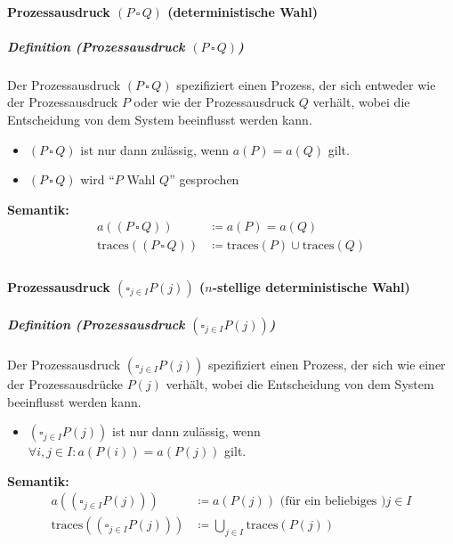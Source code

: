 \documentclass[a4paper, 11pt, accentcolor = tud3b]{tudreport}
\newcommand{\subsubparagraph}[1]{\hspace{1cm} \textbf{#1:}}
\newcommand{\definition}[2]{\subparagraph{Definition (#1)} #2}
\begin{document}
				    \paragraph{Prozessausdruck $ (P \,\square\, Q) $ (deterministische Wahl)}
					    \definition{Prozessausdruck $ (P \,\square\, Q) $}{
					    	Der Prozessausdruck $ (P \,\square\, Q) $ spezifiziert einen Prozess, der sich entweder wie der Prozessausdruck $ P $ oder wie der Prozessausdruck $ Q $ verhält, wobei die Entscheidung von dem System beeinflusst werden kann.
					    	\begin{itemize}
					    		\item $ (P \,\square\, Q) $ ist nur dann zulässig, wenn $ a(P) = a(Q) $ gilt.
					    		\item $ (P \,\square\, Q) $ wird \enquote{$ P $ Wahl $ Q $} gesprochen
					    	\end{itemize}
					    	
					    	\subsubparagraph{Semantik}
						    	\begin{align*}
							    	a((P \,\square\, Q)) &\coloneqq a(P) = a(Q) \\
							    	\text{traces}((P \,\square\, Q)) &\coloneqq \text{traces}(P) \cup \text{traces}(Q) \\
						    	\end{align*}
					    }
				    
				    \paragraph{Prozessausdruck $ (\square _ { j \in I } P(j)) $ ($ n $-stellige deterministische Wahl)}
					    \definition{Prozessausdruck $ (\square _ { j \in I } P(j)) $}{
					    	Der Prozessausdruck $ (\square _ { j \in I } P(j)) $ spezifiziert einen Prozess, der sich wie einer der Prozessausdrücke $ P(j) $ verhält, wobei die Entscheidung von dem System beeinflusst werden kann.
					    	\begin{itemize}
					    		\item $ (\square _ { j \in I } P(j)) $ ist nur dann zulässig, wenn $ \forall i, j \in I : a(P(i)) = a(P(j)) $ gilt.
					    	\end{itemize}
					    	
					    	\subsubparagraph{Semantik}
						    	\begin{align*}
							    	a((\square _ { j \in I } P(j))) &\coloneqq a(P(j)) \text{ (für ein beliebiges )} j \in I \\
							    	\text{traces}((\square _ { j \in I } P(j))) &\coloneqq \bigcup _ { j \in I } \text{traces}(P(j)) \\
						    	\end{align*}
					    }
				    
\end{document}
